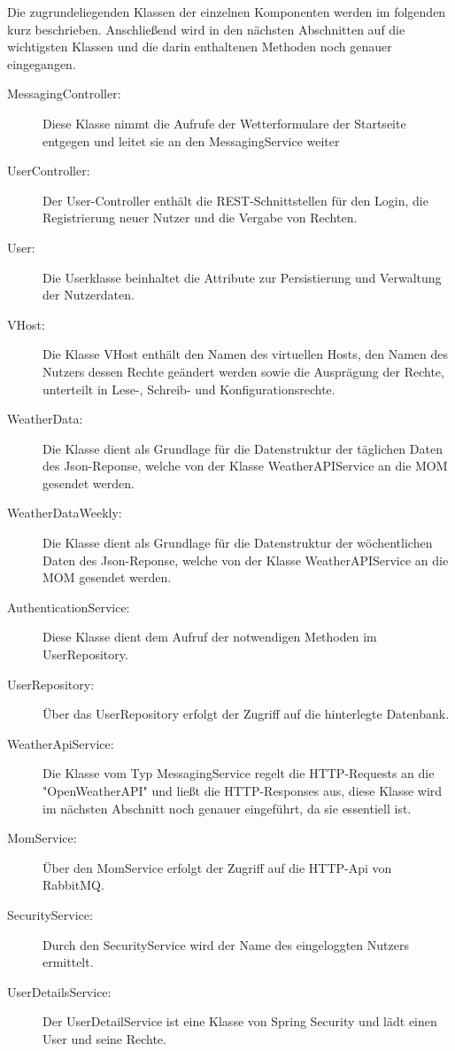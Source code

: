 Die zugrundeliegenden Klassen der einzelnen Komponenten werden im folgenden kurz beschrieben. Anschließend wird in den nächsten Abschnitten auf die wichtigsten Klassen und die darin enthaltenen Methoden noch genauer eingegangen. 

\begin{description}


\item[MessagingController:]Diese Klasse nimmt die Aufrufe der Wetterformulare der Startseite entgegen und leitet sie an den MessagingService weiter

\item[UserController:]Der User-Controller enthält die REST-Schnittstellen für den Login, die Registrierung neuer Nutzer und die Vergabe von Rechten. 
\item[User:]Die Userklasse beinhaltet die Attribute zur Persistierung und Verwaltung der Nutzerdaten.
\item[VHost:] Die Klasse VHost enthält den Namen des virtuellen Hosts, den Namen des Nutzers dessen Rechte geändert werden sowie die Ausprägung der Rechte, unterteilt in Lese-, Schreib- und Konfigurationsrechte.
\item[WeatherData:]Die Klasse dient als Grundlage für die Datenstruktur der täglichen Daten des Json-Reponse, welche von der Klasse WeatherAPIService an die MOM gesendet werden. 
\item[WeatherDataWeekly:]Die Klasse dient als Grundlage für die Datenstruktur der wöchentlichen Daten des Json-Reponse, welche von der Klasse WeatherAPIService an die MOM gesendet werden. 
\item[AuthenticationService:]Diese Klasse dient dem Aufruf der notwendigen Methoden im UserRepository.
\item[UserRepository:]Über das UserRepository erfolgt der Zugriff auf die hinterlegte Datenbank.
\item[WeatherApiService:]Die Klasse vom Typ MessagingService regelt die HTTP-Requests an die "OpenWeatherAPI" und ließt die HTTP-Responses aus, diese Klasse wird im nächsten Abschnitt noch genauer eingeführt, da sie essentiell ist. 

\item[MomService:]Über den MomService erfolgt der Zugriff auf die HTTP-Api von RabbitMQ.
\item[SecurityService:]Durch den SecurityService wird der Name des eingeloggten Nutzers ermittelt.

\item[UserDetailsService:]Der UserDetailService ist eine Klasse von Spring Security und lädt einen User und seine Rechte.


\end{description}
